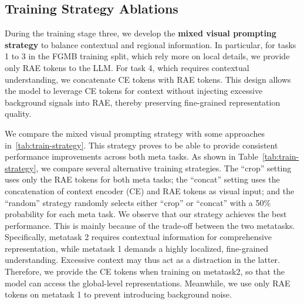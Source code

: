 \subsection{Training Strategy Ablations}

During the training stage three, we develop the \textbf{mixed visual prompting strategy} to balance contextual and regional information. In particular, for tasks 1 to 3 in the FGMB training split, which rely more on local details, we provide only RAE tokens to the LLM. For task 4, which requires contextual understanding, we concatenate CE tokens with RAE tokens. This design allows the model to leverage CE tokens for context without injecting excessive background signals into RAE, thereby preserving fine-grained representation quality. 

We compare the mixed visual prompting strategy with some approaches in~\ref{tab:train-strategy}. This strategy proves to be able to provide consistent performance improvements across both meta tasks. As shown in Table~\ref{tab:train-strategy}, we compare several alternative training strategies. The ``crop'' setting uses only the RAE tokens for both meta tasks; the ``concat'' setting uses the concatenation of context encoder (CE) and RAE tokens as visual input; and the ``random'' strategy randomly selects either ``crop'' or ``concat'' with a 50\% probability for each meta task. We observe that our strategy achieves the best performance. This is mainly because of the trade-off between the two metatasks. Specifically, metatask 2 requires contextual information for comprehensive representation, while metatask 1 demands a highly localized, fine-grained understanding. Excessive context may thus act as a distraction in the latter. Therefore, we provide the CE tokens when training on metatask2, so that the model can access the global-level representations. Meanwhile, we use only RAE tokens on metatask 1 to prevent introducing background noise. %

\begin{table}[h]
\centering
\caption{Ablations on the training strategy in Stage-III using 3B models, evaluated on FGMB.
}
\label{tab:train-strategy}
\end{table}

